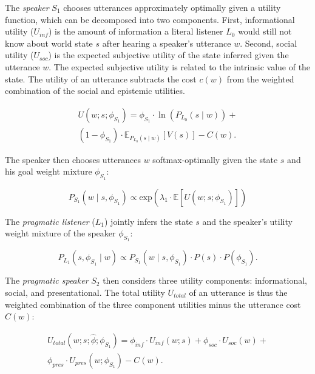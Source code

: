 \documentclass[9pt,twocolumn,twoside,lineno]{main_class_file}
\begin{document}
{The \emph{speaker} $S_1$ chooses utterances approximately optimally given a utility function, which can be decomposed into two components. 
First, informational utility ($U_{inf}$) is the amount of information a literal listener $L_0$ would still not know about world state $s$ after hearing a speaker's utterance $w$. 
Second, social utility ($U_{soc}$) is the expected subjective utility of the state inferred given the utterance $w$. 
The expected subjective utility is related to the intrinsic value of the state. 
The utility of an utterance subtracts the cost $c(w)$ from the weighted combination of the social and epistemic utilities. 

\begin{equation}
\begin{split}
U(w; s; \phi_{S_1}) = \phi_{S_1} \cdot \ln(P_{L_0}(s \mid w)) + \\ (1 - \phi_{S_1}) \cdot \mathbb{E}_{P_{L_0}(s \mid w)}[V(s)] - C(w).
\end{split}
\end{equation}

\noindent The speaker then chooses utterances $w$ softmax-optimally given the state $s$ and his goal weight mixture $\phi_{S_1}$: 

\begin{equation} 
P_{S_1}(w \mid s, \phi_{S_1}) \propto \mathrm{exp}(\lambda_{1} \cdot \mathbb{E}[U(w; s; \phi_{S_1})])
\end{equation}

\noindent The \emph{pragmatic listener} ($L_1$) jointly infers the state $s$ and the speaker's utility weight mixture of the speaker $\phi_{S_1}$:

\begin{equation} 
P_{L_1}(s, \phi_{S_1} \mid w) \propto P_{S_1}(w \mid s, \phi_{S_1})\cdot P(s) \cdot P( \phi_{S_1}).
\end{equation}

The \emph{pragmatic speaker} $S_2$ then considers three utility components: informational, social, and presentational. The
total utility $U_{total}$ of an utterance is thus the weighted combination of the three component utilities minus the utterance cost \(C(w)\):

\begin{equation}
\begin{split}
U_{total}(w; s; \hat{\phi}; \phi_{S_1}) = \phi_{inf} \cdot U_{inf}(w; s) + \phi_{soc} \cdot U_{soc}(w) + \\ \phi_{pres} \cdot U_{pres}(w; \phi_{S_1}) - C(w).
\end{split}
\end{equation}

}
\end{document}
